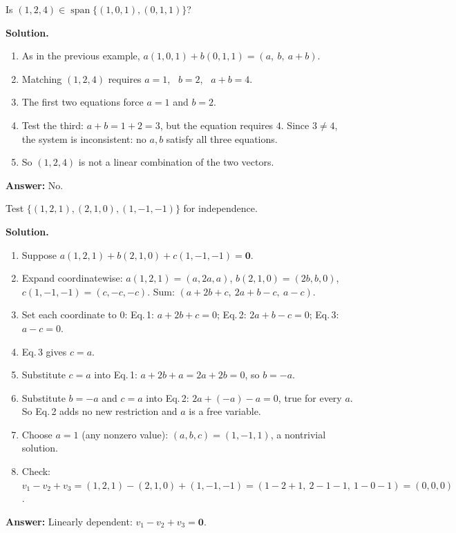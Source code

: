 \documentclass[11pt]{article}
\begin{document}
\begin{tcolorbox}[colback=white,colframe=ink!60,title={\bfseries Example 3 \textperiodcentered\ Membership (negative)}]Is $(1,2,4)\in\operatorname{span}\{(1,0,1),(0,1,1)\}$?
\par\smallskip
\textbf{Solution.} \begin{enumerate}[leftmargin=1.6em,itemsep=1pt,topsep=2pt,label=\arabic*.]\item As in the previous example, $a(1,0,1)+b(0,1,1)=(a,\ b,\ a+b)$.
\item Matching $(1,2,4)$ requires $a=1$, \ $b=2$, \ $a+b=4$.
\item The first two equations force $a=1$ and $b=2$.
\item Test the third: $a+b=1+2=3$, but the equation requires $4$. Since $3\ne4$, the system is inconsistent: no $a,b$ satisfy all three equations.
\item So $(1,2,4)$ is not a linear combination of the two vectors.
\end{enumerate}\textbf{Answer:} No.
\end{tcolorbox}
\begin{tcolorbox}[colback=white,colframe=ink!60,title={\bfseries Example 4 \textperiodcentered\ Dependence, finding a relation}]Test $\{(1,2,1),(2,1,0),(1,-1,-1)\}$ for independence.
\par\smallskip
\textbf{Solution.} \begin{enumerate}[leftmargin=1.6em,itemsep=1pt,topsep=2pt,label=\arabic*.]\item Suppose $a(1,2,1)+b(2,1,0)+c(1,-1,-1)=\mathbf 0$.
\item Expand coordinatewise: $a(1,2,1)=(a,2a,a)$, $b(2,1,0)=(2b,b,0)$, $c(1,-1,-1)=(c,-c,-c)$. Sum: $(a+2b+c,\ 2a+b-c,\ a-c)$.
\item Set each coordinate to $0$: Eq.\,1: $a+2b+c=0$; Eq.\,2: $2a+b-c=0$; Eq.\,3: $a-c=0$.
\item Eq.\,3 gives $c=a$.
\item Substitute $c=a$ into Eq.\,1: $a+2b+a=2a+2b=0$, so $b=-a$.
\item Substitute $b=-a$ and $c=a$ into Eq.\,2: $2a+(-a)-a=0$, true for every $a$. So Eq.\,2 adds no new restriction and $a$ is a free variable.
\item Choose $a=1$ (any nonzero value): $(a,b,c)=(1,-1,1)$, a nontrivial solution.
\item Check: $v_1-v_2+v_3=(1,2,1)-(2,1,0)+(1,-1,-1)=(1-2+1,\ 2-1-1,\ 1-0-1)=(0,0,0)$ \checkmark.
\end{enumerate}\textbf{Answer:} Linearly dependent: $v_1-v_2+v_3=\mathbf 0$.
\end{tcolorbox}
\end{document}
